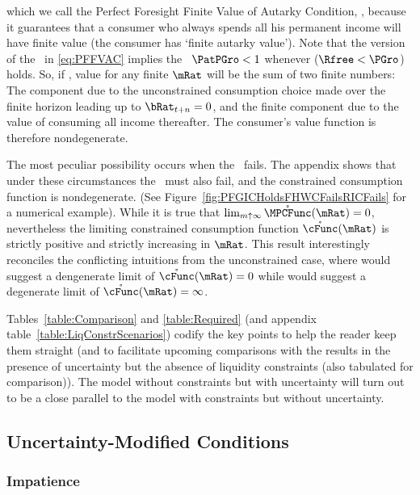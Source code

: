 \documentclass[./BufferStockTheory.tex]{subfiles}
\begin{document}
which we call the Perfect Foresight Finite Value of Autarky Condition, \PFFVAC, because it guarantees that a consumer who always spends all his permanent income will have finite value (the consumer has `finite autarky value').  Note that the version of the \PFFVAC~in \eqref{eq:PFFVAC} implies the \PFGIC~$\PatPGro < 1$ whenever \cncl{\FHWC} ($\Rfree < \PGro$) holds.  So, if \cncl{\FHWC}, value for any finite $\mRat$ will be the sum of two finite numbers: The component due to the unconstrained consumption choice made over the finite horizon leading up to $\bRat_{t+n} = 0$, and the finite component due to the value of consuming all income thereafter.  The consumer's value function is therefore nondegenerate.

The most peculiar possibility occurs when the \RIC~fails.  The appendix shows that under these circumstances the \FHWC~must also fail, and the constrained consumption function is nondegenerate.  (See Figure~\ref{fig:PFGICHoldsFHWCFailsRICFails} for a numerical example).  While it is true that $\lim_{m \uparrow \infty}
\mathring{\MPCFunc}(\mRat) = 0$, nevertheless the limiting constrained
consumption function $\mathring{\cFunc}(\mRat)$ is strictly positive
and strictly increasing in $\mRat$.  This result interestingly
reconciles the conflicting intuitions from the unconstrained case,
where \cncl{\RIC} would suggest a dengenerate limit of
$\mathring{\cFunc}(\mRat)=0$ while \cncl{\FHWC} would suggest a
degenerate limit of $\mathring{\cFunc}(\mRat)=\infty$.

Tables~\ref{table:Comparison} and \ref{table:Required} (and appendix
table~\ref{table:LiqConstrScenarios}) codify the key points to help
the reader keep them straight (and to facilitate upcoming comparisons
with the results in the presence of uncertainty
but the absence of liquidity constraints (also tabulated for comparison)).  The model without constraints but with uncertainty will turn out to be a close parallel to the model with constraints but without uncertainty.

\hypertarget{Uncertainty-Modified-Conditions}{}
\subsection{Uncertainty-Modified Conditions}
\subsubsection{Impatience}
\end{document}
